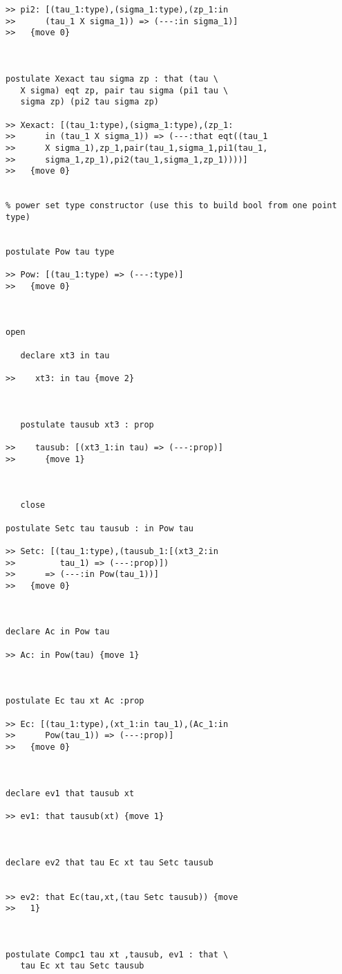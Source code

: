 \documentclass[12pt]{article}
\begin{document}
\begin{verbatim}
>> pi2: [(tau_1:type),(sigma_1:type),(zp_1:in
>>      (tau_1 X sigma_1)) => (---:in sigma_1)]
>>   {move 0}



postulate Xexact tau sigma zp : that (tau \
   X sigma) eqt zp, pair tau sigma (pi1 tau \
   sigma zp) (pi2 tau sigma zp)

>> Xexact: [(tau_1:type),(sigma_1:type),(zp_1:
>>      in (tau_1 X sigma_1)) => (---:that eqt((tau_1
>>      X sigma_1),zp_1,pair(tau_1,sigma_1,pi1(tau_1,
>>      sigma_1,zp_1),pi2(tau_1,sigma_1,zp_1))))]
>>   {move 0}


% power set type constructor (use this to build bool from one point type)


postulate Pow tau type

>> Pow: [(tau_1:type) => (---:type)]
>>   {move 0}



open

   declare xt3 in tau

>>    xt3: in tau {move 2}



   postulate tausub xt3 : prop

>>    tausub: [(xt3_1:in tau) => (---:prop)]
>>      {move 1}



   close

postulate Setc tau tausub : in Pow tau

>> Setc: [(tau_1:type),(tausub_1:[(xt3_2:in
>>         tau_1) => (---:prop)])
>>      => (---:in Pow(tau_1))]
>>   {move 0}



declare Ac in Pow tau

>> Ac: in Pow(tau) {move 1}



postulate Ec tau xt Ac :prop

>> Ec: [(tau_1:type),(xt_1:in tau_1),(Ac_1:in
>>      Pow(tau_1)) => (---:prop)]
>>   {move 0}



declare ev1 that tausub xt

>> ev1: that tausub(xt) {move 1}



declare ev2 that tau Ec xt tau Setc tausub


>> ev2: that Ec(tau,xt,(tau Setc tausub)) {move
>>   1}



postulate Compc1 tau xt ,tausub, ev1 : that \
   tau Ec xt tau Setc tausub


\end{verbatim}
\end{document}
